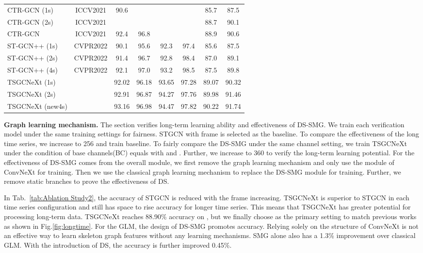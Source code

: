 \documentclass[10pt,twocolumn,letterpaper]{article}
\begin{document}
\begin{table*}
\begin{tabular}{lc|cc|cc|cc}
    CTR-GCN (1s) & ICCV2021 & 90.6  &  &  &  & 85.7  & 87.5  \\
    CTR-GCN (2s) & ICCV2021 &  &  &  &  & 88.7  & 90.1 \\
    CTR-GCN & ICCV2021 & 92.4  & 96.8  &  &  & 88.9  & 90.6 \\
    ST-GCN++ (1s) & CVPR2022 & 90.1  & 95.6  & 92.3  & 97.4  & 85.6  & 87.5  \\
    ST-GCN++ (2s) & CVPR2022 & 91.4  & 96.7  & 92.8  & 98.4  & 87.0  & 89.1 \\
    ST-GCN++ (4s) & CVPR2022 & 92.1  & 97.0  & 93.2  & \color{red}98.5  & 87.5  & 89.8 \\
    \midrule
    TSGCNeXt (1s) &      & 92.02 & 96.18 & 93.65 & 97.28 & 89.07 & 90.32\\
    TSGCNeXt (2s) &      & 92.91 & 96.87 & 94.27 & 97.76 & 89.98 & 91.46\\
    TSGCNeXt (new4s) &   & 93.16 & 96.98 & \color{red}94.47 & 97.82  & \color{red}90.22 & \color{red}91.74\\
    \bottomrule
    \end{tabular}\label{tab:finnal}\end{table*} 
\noindent\textbf{Graph learning mechanism.} The section verifies long-term learning ability and effectiveness of DS-SMG. We train each verification model under the same training settings for fairness. STGCN with frame  is selected as the baseline. To compare the effectiveness of the long time series, we increase  to 256 and train baseline. To fairly compare the DS-SMG under the same channel setting, we train TSGCNeXt under the condition of base channels(BC) equals  with  and . Further, we increase  to 360 to verify the long-term learning potential. For the effectiveness of DS-SMG comes from the overall module, we first remove the graph learning mechanism and only use the module of ConvNeXt for training. Then we use the classical graph learning mechanism to replace the DS-SMG module for training. Further, we remove static branches to prove the effectiveness of DS. 


 In Tab.~\ref{tab:Ablation Study2}, the accuracy of STGCN is reduced with the frame increasing. TSGCNeXt is superior to STGCN in each time series configuration and still has space to rise accuracy for longer time series. This means that TSGCNeXt has greater potential for processing long-term data. TSGCNeXt reaches 88.90\% accuracy on , but we finally choose  as the primary setting to match previous works as shown in Fig.\ref{fig:longtime}. For the GLM, the design of DS-SMG promotes accuracy. Relying solely on the structure of ConvNeXt is not an effective way to learn skeleton graph features without any learning mechanisms. SMG alone also has a 1.3\% improvement over classical GLM. With the introduction of DS, the accuracy is further improved 0.45\%.
\end{document}
